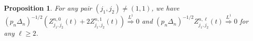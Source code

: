 \documentclass[ecta,nameyear,draft]{econsocart}
\newtheorem{prop}[theorem]{Proposition}
\newcommand{\limL}{\stackrel{L^1}{\Longrightarrow}}
\newcommand{\1}{\mathbf 1}
\numberwithin{equation}{section}
\begin{document}
\begin{appendix}
\begin{prop}
\label{prop:CLT:dominated}
For any pair $(j_1, j_2) \neq (1,1)$, we have
$
(p_n\Delta_n)^{-1/2} (Z_{j_1, j_2}^{n,0}(t) + 2 Z_{j_1, j_2}^{n,1}(t))\limL0$ and $(p_n\Delta_n)^{-1/2} Z_{j_1, j_2}^{n,\ell}(t)\limL0$ for any $\ell \geq 2$.
\end{prop}

\end{appendix}













\end{document}
